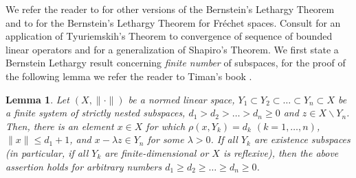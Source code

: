 \documentclass[12pt, reqno]{amsart}
\newtheorem{lemma}[theorem]{Lemma}
\theoremstyle{definition}
\theoremstyle{remark}
\numberwithin{equation}{section}
\begin{document}
    We refer the reader to \cite{Ak-Al,Ak-Le,Al-To, Borodin1,Lew1} for other versions of the Bernstein's Lethargy Theorem  and  to \cite{Ak-Le2,Alb,Mich,Ple1,Vas} for the Bernstein's Lethargy Theorem for Fr\'{e}chet  spaces. Consult \cite{De-Hu} for an application of Tyuriemskih's Theorem to convergence of sequence of bounded linear operators and  \cite{Al-Oi} for a generalization of Shapiro's Theorem.
    We first  state a  Bernstein Lethargy result concerning \textit{finite number} of subspaces, for the proof  of the following lemma we refer the reader to Timan's book  \cite{Tim}.
\begin{lemma}
\label{lemma1}
Let $(X,\|\cdot\|)$ be a normed linear space, $Y_1\subset Y_2\subset\ldots\subset Y_n\subset X$ be a finite system of strictly nested subspaces, $d_1>d_2>\ldots>d_n\ge0$ and $z \in X\backslash Y_n$. Then, there is an element $x\in X$ for which $\rho(x,Y_k)=d_k$ $(k=1,\ldots,n)$,  $\|x\|\le d_1+1$, and $x-\lambda z\in Y_n$ for some $\lambda>0$. If all $Y_k$ are existence subspaces (in particular, if all $Y_k$ are finite-dimensional or $X$ is reflexive),
then the above assertion holds for arbitrary numbers $d_1 \ge d_2 \ge \ldots\ge d_n \ge 0$.
\end{lemma}

    
\end{document}
